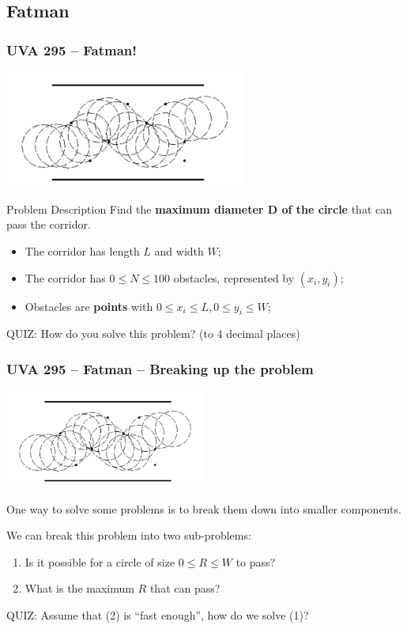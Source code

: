 \documentclass{beamer}
\begin{document}
\subsection{Fatman}
\begin{frame}
  \frametitle{UVA 295 -- Fatman!}
  \begin{center}
    \includegraphics[width=0.6\textwidth]{img/fatman}
  \end{center}

  {\smaller
    \begin{block}{Problem Description}
      Find the {\bf maximum diameter D of the circle} that can pass the corridor.
      \begin{itemize}
      \item The corridor has length $L$ and width $W$;
      \item The corridor has $0 \leq N \leq 100$ obstacles, represented by $(x_i,y_i)$;
      \item Obstacles are {\bf points} with $0 \leq x_i \leq L, 0\leq y_i \leq W$;
      \end{itemize}
    \end{block}

    \alert{QUIZ:} How do you solve this problem? (to 4 decimal places)
  }
\end{frame}

\begin{frame}
  \frametitle{UVA 295 -- Fatman -- Breaking up the problem}
  \begin{center}
    \includegraphics[width=0.5\textwidth]{img/fatman}
  \end{center}

  {\smaller
  One way to solve some problems is to break them down into smaller
  components.

  \bigskip

  We can break this problem into two sub-problems:
  \begin{block}{}
  \begin{enumerate}
  \item Is it possible for a circle of size $0 \leq R \leq W$ to pass?
  \item What is the maximum $R$ that can pass?
  \end{enumerate}
  \end{block}

  \alert{QUIZ}: Assume that (2) is ``fast enough'', how do we solve (1)?
  }
\end{frame}
\end{document}
